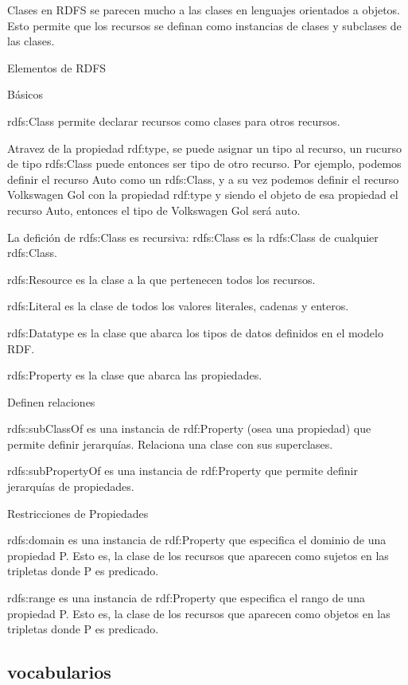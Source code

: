 Clases en RDFS se parecen mucho a las clases en lenguajes orientados a objetos. Esto permite que los recursos se definan como 
instancias de clases y subclases de las clases.

Elementos de RDFS

Básicos

    rdfs:Class permite declarar recursos como clases para otros recursos. 
    
    Atravez de la propiedad rdf:type, se puede asignar un tipo al recurso, un rucurso de tipo rdfs:Class puede entonces ser tipo de otro recurso. 
    Por ejemplo, podemos definir el recurso Auto como un rdfs:Class, y a su vez podemos definir el recurso Volkswagen Gol con la propiedad rdf:type 
    y siendo el objeto de esa propiedad el recurso Auto, entonces el tipo de Volkswagen Gol será auto.
    
    La defición de rdfs:Class es recursiva: rdfs:Class es la rdfs:Class de cualquier rdfs:Class.

    rdfs:Resource es la clase a la que pertenecen todos los recursos.

    rdfs:Literal es la clase de todos los valores literales, cadenas y enteros.

    rdfs:Datatype es la clase que abarca los tipos de datos definidos en el modelo RDF.

    rdfs:Property es la clase que abarca las propiedades.

Definen relaciones

    rdfs:subClassOf es una instancia de rdf:Property (osea una propiedad) que permite definir jerarquías. Relaciona una clase con sus superclases.

    rdfs:subPropertyOf es una instancia de rdf:Property que permite definir jerarquías de propiedades.
    
Restricciones de Propiedades

    rdfs:domain es una instancia de rdf:Property que especifica el dominio de una propiedad P. Esto es, la clase de los recursos que aparecen como sujetos en las tripletas donde P es predicado.

    rdfs:range es una instancia de rdf:Property que especifica el rango de una propiedad P. Esto es, la clase de los recursos que aparecen como objetos en las tripletas donde P es predicado.
    
    
\subsection{vocabularios}

